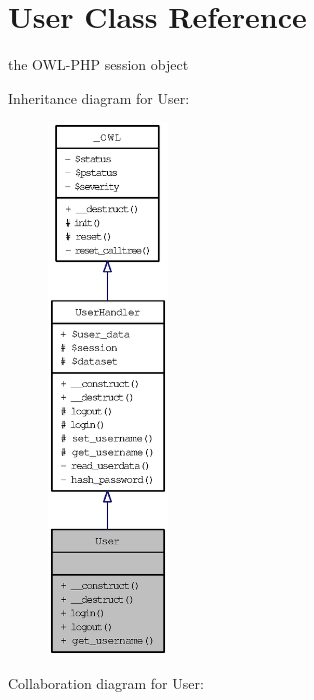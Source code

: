 \hypertarget{classUser}{
\section{User Class Reference}
\label{classUser}
}
the OWL-PHP session object  


Inheritance diagram for User:\nopagebreak
\begin{figure}[H]
\begin{center}
\leavevmode
\includegraphics[height=400pt]{classUser__inherit__graph}
\end{center}
\end{figure}
Collaboration diagram for User:\nopagebreak
